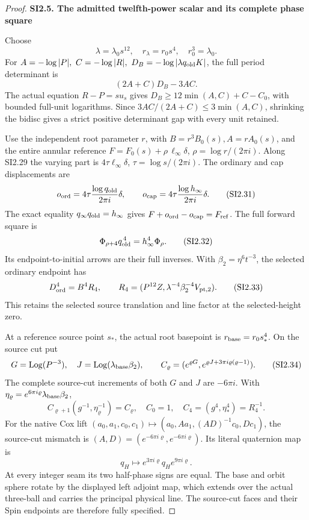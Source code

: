 \begin{proof}
\par

\medskip\noindent\textbf{SI2.5. The admitted twelfth-power scalar and its complete phase square}

\par\nobreak

Choose
\[
 \lambda=\lambda_0s^{12},\quad r_\lambda=r_0s^4,\quad r_0^3=\lambda_0.
 \tag{SI2.29}
\]
For \(A=-\log|P|,\ C=-\log|R|,\ D_B=-\log|\lambda q_{\rm old}K|\),
the full period determinant is
\[
 (2A+C)D_B-3AC.
 \tag{SI2.30}
\]
The actual equation \(R-P=su_s\) gives
\(D_B\ge12\min(A,C)+C-C_0\), with bounded full-unit logarithms.
Since \(3AC/(2A+C)\le3\min(A,C)\), shrinking the bidisc gives a
strict positive determinant gap with every unit retained.

Use the independent root parameter \(r\), with
\(B=r^3B_0(s),A=rA_0(s)\), and the entire annular reference
\(F=F_0(s)+\rho\,\ell_\infty\delta\),
\(\rho=\log r/(2\pi i)\). Along SI2.29 the varying part is
\(4\tau\ell_\infty\delta\), \(\tau=\log s/(2\pi i)\).
The ordinary and cap displacements are
\[
 o_{\rm ord}=4\tau\frac{\log q_{\rm old}}{2\pi i}\delta,\qquad
 o_{\rm cap}=4\tau\frac{\log h_\infty}{2\pi i}\delta.
 \tag{SI2.31}
\]
The exact equality \(q_\infty q_{\rm old}=h_\infty\) gives
\(F+o_{\rm ord}-o_{\rm cap}=F_{\rm ref}\). The full forward square is
\[
 \Phi_{\rho+4}q_{\rm old}^{\,4}=h_\infty^4\Phi_\rho .
 \tag{SI2.32}
\]
Its endpoint-to-initial arrows are their full inverses.
With \(\beta_2=\eta^6t^{-3}\), the selected ordinary endpoint has
\[
 D_{\rm ord}^4=B^4R_4,\qquad
 R_4=(P^{12}Z,\lambda^{-4}\beta_2^{-4}V_{{\rm pt},2}).
 \tag{SI2.33}
\]
This retains the selected source translation and line factor at
the selected-height zero.

At a reference source point \(s_*\), the actual root basepoint is
\(r_{\rm base}=r_0s_*^4\). On the source cut put
\[
 G=\operatorname{Log}(P^{-3}),\quad
 J=\operatorname{Log}(\lambda_{\rm base}\beta_2),\qquad
 C_\varrho=(e^{\varrho G},
   e^{\varrho J+3\pi i\varrho(\varrho-1)}).
 \tag{SI2.34}
\]
The complete source-cut increments of both \(G\) and \(J\) are
\(-6\pi i\). With
\(\eta_\varrho=e^{6\pi i\varrho}\lambda_{\rm base}\beta_2\),
\[
 C_{\varrho+1}(g^{-1},\eta_\varrho^{-1})=C_\varrho,\quad
 C_0=1,\quad C_4=(g^4,\eta_*^4)=R_4^{-1}.
 \tag{SI2.35}
\]
For the native Cox lift
\((a_0,a_1,c_0,c_1)\mapsto(a_0,Aa_1,(AD)^{-1}c_0,Dc_1)\),
the source-cut mismatch is \((A,D)=(e^{-6\pi i\varrho},e^{-6\pi i\varrho})\).
Its literal quaternion map is
\[
 q_H\longmapsto e^{3\pi i\varrho}q_H e^{9\pi i\varrho}.
 \tag{SI2.36}
\]
At every integer seam its two half-phase signs are equal.
The base and orbit sphere rotate by the displayed left adjoint
map, which extends over the actual three-ball and carries the
principal physical line. The source-cut faces and their Spin
endpoints are therefore fully specified.


\end{proof}
